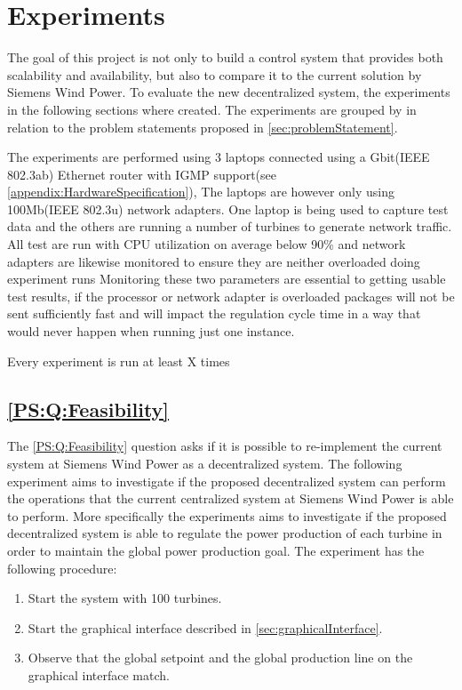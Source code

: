 
\chapter{Experiments}\label{cha:experiments}

\newcommand{\failingTurbineNumbers}{1, 5, 10, 30}
\newcommand{\testTurbineNumbers}{2, 21, 41, 61, 81 and 101}
\newcommand{\testCycletimeNumbers}{5ms, 10ms, 15ms, 20ms, 25ms and 30ms}
\newcommand{\experiemntRunTime}{2mins}

The goal of this project is not only to build a control system that provides both scalability and availability, but also to compare it to the current solution by Siemens Wind Power.
To evaluate the new decentralized system, the experiments in the following sections where created. 
The experiments are grouped by in relation to the problem statements proposed in \cref{sec:problemStatement}.

The experiments are performed using 3 laptops connected using a Gbit(IEEE 802.3ab) Ethernet router with IGMP support(see \cref{appendix:HardwareSpecification}), The laptops are however only using 100Mb(IEEE 802.3u) network adapters.
One laptop is being used to capture test data and the others are running a number of turbines to generate network traffic.
All test are run with CPU utilization on average below 90\% and network adapters are likewise monitored to ensure they are neither overloaded doing experiment runs
Monitoring these two parameters are essential to getting usable test results, if the processor or network adapter is overloaded packages will not be sent sufficiently fast and will impact the regulation cycle time in a way that would never happen when running just one instance.

Every experiment is run at least X  times 

\section{\ref{PS:Q:Feasibility}}

The \ref{PS:Q:Feasibility} question asks if it is possible to re-implement the current system at Siemens Wind Power as a decentralized system. The following experiment aims to investigate if the proposed decentralized system can perform the operations that the current centralized system at Siemens Wind Power is able to perform. More specifically the experiments aims to investigate if the proposed decentralized system is able to regulate the power production of each turbine in order to maintain the global power production goal.
The experiment has the following procedure:
\begin{enumerate}
	\item Start the system with 100 turbines.
	\item Start the graphical interface described in \cref{sec:graphicalInterface}.
	\item Observe that the global setpoint and the global production line on the graphical interface match.
\end{enumerate}

